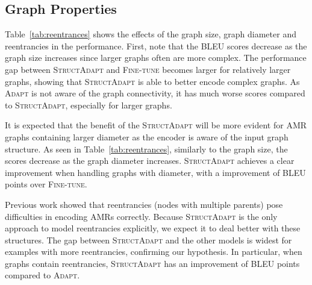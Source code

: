 \documentclass[11pt]{article}
\newcommand{\graphadapter}{{\small\textsc{StructAdapt}}\xspace}
\newcommand{\vanilladapter}{{\small\textsc{Adapt}}\xspace}
\newcommand{\finetune}{{\small\textsc{Fine-tune}}\xspace}
\begin{document}
\subsection{Graph Properties}

Table~\ref{tab:reentrances} shows the effects of the graph size, graph diameter and reentrancies in the performance. First, note that the BLEU scores decrease as the graph size increases since larger graphs often are more complex. The performance gap between \graphadapter and \finetune becomes larger for relatively larger graphs, showing that \graphadapter is able to better encode complex graphs. As \vanilladapter is not aware of the graph connectivity, it has much worse scores compared to \graphadapter, especially for larger graphs. 

It is expected that the beneﬁt of the \graphadapter will be more evident for AMR graphs containing larger diameter as the encoder is aware of the input graph structure. As seen in Table~\ref{tab:reentrances}, similarly to the graph size, the scores decrease as the graph diameter increases. \graphadapter achieves a clear improvement when handling graphs with  diameter, with a improvement of  BLEU points over \finetune. 

Previous work \cite{damonte-cohen-2019-structural,szubert-etal-2020-role} showed that reentrancies (nodes with multiple parents) pose difficulties in encoding AMRs correctly. Because \graphadapter is the only approach to model reentrancies explicitly, we expect it to deal better with these structures. The gap between \graphadapter and the other models is widest for examples with more reentrancies, confirming our hypothesis. In particular, when graphs contain  reentrancies, \graphadapter has an improvement of  BLEU points compared to \vanilladapter.
\end{document}
